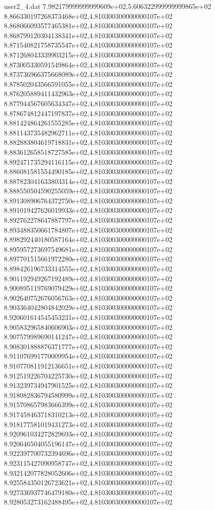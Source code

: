 \begin{filecontents}{user2_4.dat}
7.982179999999999609e+02,5.606322999999999865e+02
8.866330197268373468e+02,4.810300300000000107e+02
8.868066093577465381e+02,4.810300300000000107e+02
8.868799120304138341e+02,4.810300300000000107e+02
8.871540821758735547e+02,4.810300300000000107e+02
8.871268043339903215e+02,4.810300300000000107e+02
8.873005330591549864e+02,4.810300300000000107e+02
8.873736966375668089e+02,4.810300300000000107e+02
8.878502043566591055e+02,4.810300300000000107e+02
8.876205889411432963e+02,4.810300300000000107e+02
8.877944567605634347e+02,4.810300300000000107e+02
8.878674812447197837e+02,4.810300300000000107e+02
8.881424864261555285e+02,4.810300300000000107e+02
8.881143735482962711e+02,4.810300300000000107e+02
8.882883804619718831e+02,4.810300300000000107e+02
8.883612658518727585e+02,4.810300300000000107e+02
8.892471735294116115e+02,4.810300300000000107e+02
8.886081581554490185e+02,4.810300300000000107e+02
8.887823041633803314e+02,4.810300300000000107e+02
8.888550504590255059e+02,4.810300300000000107e+02
8.891308906764372750e+02,4.810300300000000107e+02
8.891019427626019933e+02,4.810300300000000107e+02
8.892762278647887797e+02,4.810300300000000107e+02
8.893488350661784807e+02,4.810300300000000107e+02
8.898292440180587164e+02,4.810300300000000107e+02
8.895957273697549681e+02,4.810300300000000107e+02
8.897701515661972280e+02,4.810300300000000107e+02
8.898426196733314555e+02,4.810300300000000107e+02
8.901192949267192489e+02,4.810300300000000107e+02
8.900895119769079429e+02,4.810300300000000107e+02
8.902640752676056763e+02,4.810300300000000107e+02
8.903364042804842029e+02,4.810300300000000107e+02
8.920601614545453231e+02,4.810300300000000107e+02
8.905832965840606903e+02,4.810300300000000107e+02
8.907579989690141247e+02,4.810300300000000107e+02
8.908301888876371777e+02,4.810300300000000107e+02
8.911076991770009954e+02,4.810300300000000107e+02
8.910770811912136651e+02,4.810300300000000107e+02
8.912519226704225730e+02,4.810300300000000107e+02
8.913239734947901525e+02,4.810300300000000107e+02
8.918082836794580999e+02,4.810300300000000107e+02
8.915708657983666399e+02,4.810300300000000107e+02
8.917458463718310213e+02,4.810300300000000107e+02
8.918177581019431273e+02,4.810300300000000107e+02
8.920961034272829693e+02,4.810300300000000107e+02
8.920646504055196147e+02,4.810300300000000107e+02
8.922397700732394696e+02,4.810300300000000107e+02
8.923115427090958747e+02,4.810300300000000107e+02
8.932142077828052606e+02,4.810300300000000107e+02
8.925584350126723621e+02,4.810300300000000107e+02
8.927336937746479180e+02,4.810300300000000107e+02
8.928053273162488495e+02,4.810300300000000107e+02

\end{filecontents}
